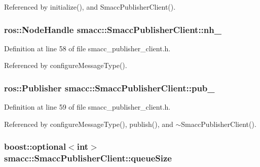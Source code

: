 Referenced by initialize(), and Smacc\+Publisher\+Client().

\subsubsection[{\texorpdfstring{nh\+\_\+}{nh_}}]{\setlength{\rightskip}{0pt plus 5cm}ros\+::\+Node\+Handle smacc\+::\+Smacc\+Publisher\+Client\+::nh\+\_\+\hspace{0.3cm}{\ttfamily [protected]}}\hypertarget{classsmacc_1_1SmaccPublisherClient_aaebda6a40634daf81c80add02f938ad3}{}\label{classsmacc_1_1SmaccPublisherClient_aaebda6a40634daf81c80add02f938ad3}


Definition at line 58 of file smacc\+\_\+publisher\+\_\+client.\+h.



Referenced by configure\+Message\+Type().

\subsubsection[{\texorpdfstring{pub\+\_\+}{pub_}}]{\setlength{\rightskip}{0pt plus 5cm}ros\+::\+Publisher smacc\+::\+Smacc\+Publisher\+Client\+::pub\+\_\+\hspace{0.3cm}{\ttfamily [protected]}}\hypertarget{classsmacc_1_1SmaccPublisherClient_a674fc5715c4983d093c8ae387232ae55}{}\label{classsmacc_1_1SmaccPublisherClient_a674fc5715c4983d093c8ae387232ae55}


Definition at line 59 of file smacc\+\_\+publisher\+\_\+client.\+h.



Referenced by configure\+Message\+Type(), publish(), and $\sim$\+Smacc\+Publisher\+Client().

\subsubsection[{\texorpdfstring{queue\+Size}{queueSize}}]{\setlength{\rightskip}{0pt plus 5cm}boost\+::optional$<$int$>$ smacc\+::\+Smacc\+Publisher\+Client\+::queue\+Size}\hypertarget{classsmacc_1_1SmaccPublisherClient_ad7a0aa074031d2c2ea332a4d517dbae5}{}\label{classsmacc_1_1SmaccPublisherClient_ad7a0aa074031d2c2ea332a4d517dbae5}


